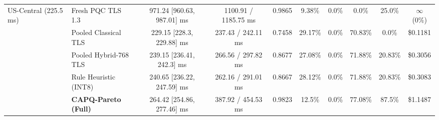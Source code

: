 \begin{table}[!t]
{\begin{tabular}{llcccccccc}
\midrule
US-Central (225.5 ms) & Fresh PQC TLS 1.3 & 971.24 [960.63, 987.01] ms & 1100.91 / 1185.75 ms & 0.9865 & 9.38\% & 0.0\% & 0.0\% & 25.0\% & $\infty$ (0\%) \\
 & Pooled Classical TLS & 229.15 [228.3, 229.88] ms & 237.43 / 242.11 ms & 0.7458 & 29.17\% & 0.0\% & 70.83\% & 0.0\% & \$0.1181 \\
 & Pooled Hybrid-768 TLS & 239.15 [236.41, 242.3] ms & 266.56 / 297.82 ms & 0.8677 & 27.08\% & 0.0\% & 71.88\% & 20.83\% & \$0.3056 \\
 & Rule Heuristic (INT8) & 240.65 [236.22, 247.59] ms & 262.16 / 291.01 ms & 0.8667 & 28.12\% & 0.0\% & 71.88\% & 20.83\% & \$0.3083 \\
 & \textbf{CAPQ-Pareto (Full)} & 264.42 [254.86, 277.46] ms & 387.92 / 454.53 ms & 0.9823 & 12.5\% & 0.0\% & 77.08\% & 87.5\% & \$1.1487 \\
\bottomrule
\end{tabular}%
}
\end{table}